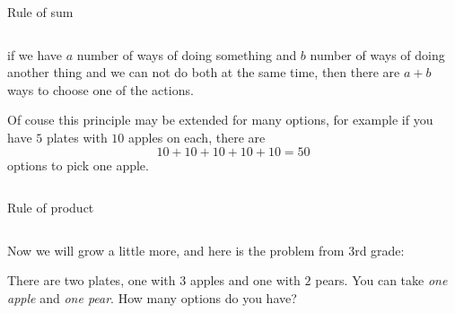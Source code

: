 \documentclass[9pt,aspectratio=169]{beamer}
\begin{document}
\begin{frame}{Rule of sum}
\begin{columns}[T]
\begin{column}{0.5\textwidth}
      \begin{definition}{}
        if we have $a$ number of ways of doing something and $b$ number of ways of doing another thing and we can not do both at the same time, then there are $a + b$ ways to choose one of the actions.
      \end{definition}

      Of couse this principle may be extended for many options, for example if you have $5$ plates with $10$ apples on each, there are 
      \[10+10+10+10+10 = 50\] 
      options to pick one apple.
    \end{column}
  \end{columns}
\end{frame}

\begin{frame}{Rule of product}
  \begin{columns}[T]
    \begin{column}{0.5\textwidth}
      Now we will grow a little more, and here is the problem from 3rd grade:

      \begin{problem}
        There are two plates, one with $3$ apples and one with $2$ pears. You can take \emph{one apple} and \emph{one pear}. How many options do you have?
      \end{problem}

      \begin{nscenter}
      \end{nscenter}


\end{column}
\end{columns}
\end{frame}
\end{document}
